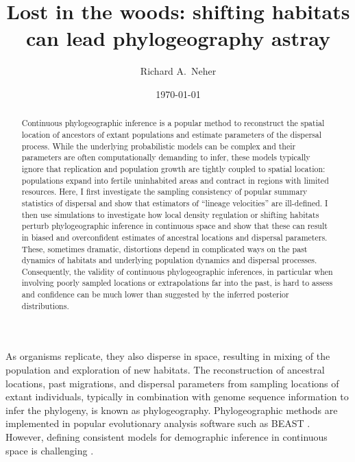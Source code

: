 \documentclass[aps,rmp, twocolumn]{revtex4}
\begin{document}
\title{Lost in the woods: shifting habitats can lead phylogeography astray}
\author{Richard A.~Neher}

\date{\today}
\begin{abstract}
Continuous phylogeographic inference is a popular method to reconstruct the spatial location of ancestors of extant populations and estimate parameters of the dispersal process.
While the underlying probabilistic models can be complex and their parameters are often computationally demanding to infer, these models typically ignore that replication and population growth are tightly coupled to spatial location: populations expand into fertile uninhabited areas and contract in regions with limited resources.
Here, I first investigate the sampling consistency of popular summary statistics of dispersal and show that estimators of ``lineage velocities'' are ill-defined.
I then use simulations to investigate how local density regulation or shifting habitats perturb phylogeographic inference in continuous space and show that these can result in biased and overconfident estimates of ancestral locations and dispersal parameters.
These, sometimes dramatic, distortions depend in complicated ways on the past dynamics of habitats and underlying population dynamics and dispersal processes.
Consequently, the validity of continuous phylogeographic inferences, in particular when involving poorly sampled locations or extrapolations far into the past, is hard to assess and confidence can be much lower than suggested by the inferred posterior distributions.
\end{abstract}

\maketitle
As organisms replicate, they also disperse in space, resulting in mixing of the population and exploration of new habitats.
The reconstruction of ancestral locations, past migrations, and dispersal parameters from sampling locations of extant individuals, typically in combination with genome sequence information to infer the phylogeny, is known as phylogeography.
Phylogeographic methods are implemented in popular evolutionary analysis software such as BEAST \citep{lemey_bayesian_2009,lemey_phylogeography_2010}.
However, defining consistent models for demographic inference in continuous space is challenging \citep{felsenstein_pain_1975,guindon_demographic_2016}.
\end{document}
